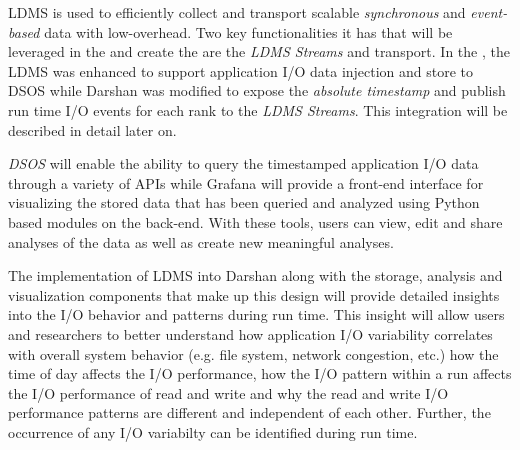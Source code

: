 \documentclass[conference]{IEEEtran}
\begin{document}
LDMS is used to efficiently collect and transport scalable \emph{synchronous} and \emph{event-based} data with low-overhead. Two key functionalities it has that will be leveraged in the \Darshan and create the \connector are the \emph{LDMS Streams} and transport. In the \Darshan, the LDMS was enhanced to support application I/O data injection and store to DSOS while Darshan was modified to expose the \emph{absolute timestamp} and publish run time I/O events for each rank to the \emph{LDMS Streams}. This integration will be described in detail later on.   


\emph{DSOS} will enable the ability to query the timestamped application I/O data through a variety of APIs while Grafana will provide a front-end interface for visualizing the stored data that has been queried and analyzed using Python based modules on the back-end. With these tools, users can view, edit and share analyses of the data as well as create new meaningful analyses. 

The implementation of LDMS into Darshan along with the storage, analysis and visualization components that make up this design will provide detailed insights into the I/O behavior and patterns during run time. This insight will allow users and researchers to better understand how application I/O variability correlates with overall system behavior (e.g. file system, network congestion, etc.) how the time of day affects the I/O performance, how the I/O pattern within a run affects the I/O performance of read and write and why the read and write I/O performance patterns are different and independent of each other. Further, the occurrence of any I/O variabilty can be identified during run time.
\end{document}
